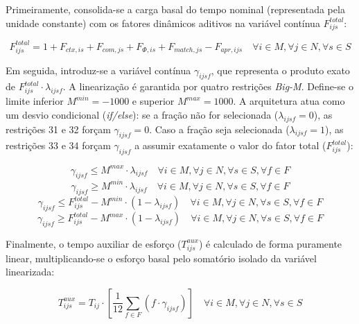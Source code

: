 \documentclass[a4paper,11pt]{article}
\begin{document}
Primeiramente, consolida-se a carga basal do tempo nominal (representada pela unidade constante) com os fatores dinâmicos aditivos na variável contínua $F^{total}_{ijs}$:

\begin{equation}
    F^{total}_{ijs} = 1 + F_{ctx, is} + F_{com, js} + F_{\Phi, is} + F_{match, js} - F_{apr, ijs} \quad \forall i \in M, \forall j \in N, \forall s \in S
\end{equation}

Em seguida, introduz-se a variável contínua $\gamma_{ijsf}$, que representa o produto exato de $F^{total}_{ijs} \cdot \lambda_{ijsf}$. A linearização é garantida por quatro restrições \textit{Big-M}. Define-se o limite inferior $M^{min} = -1000$ e superior $M^{max} = 1000$. A arquitetura atua como um desvio condicional (\textit{if/else}): se a fração não for selecionada ($\lambda_{ijsf} = 0$), as restrições 31 e 32 forçam $\gamma_{ijsf} = 0$. Caso a fração seja selecionada ($\lambda_{ijsf} = 1$), as restrições 33 e 34 forçam $\gamma_{ijsf}$ a assumir exatamente o valor do fator total ($F^{total}_{ijs}$):

\begin{equation}
    \gamma_{ijsf} \le M^{max} \cdot \lambda_{ijsf} \quad \forall i \in M, \forall j \in N, \forall s \in S, \forall f \in F
\end{equation}
\begin{equation}
    \gamma_{ijsf} \ge M^{min} \cdot \lambda_{ijsf} \quad \forall i \in M, \forall j \in N, \forall s \in S, \forall f \in F
\end{equation}
\begin{equation}
    \gamma_{ijsf} \le F^{total}_{ijs} - M^{min} \cdot (1 - \lambda_{ijsf}) \quad \forall i \in M, \forall j \in N, \forall s \in S, \forall f \in F
\end{equation}
\begin{equation}
    \gamma_{ijsf} \ge F^{total}_{ijs} - M^{max} \cdot (1 - \lambda_{ijsf}) \quad \forall i \in M, \forall j \in N, \forall s \in S, \forall f \in F
\end{equation}

Finalmente, o tempo auxiliar de esforço ($T^{aux}_{ijs}$) é calculado de forma puramente linear, multiplicando-se o esforço basal pelo somatório isolado da variável linearizada:

\begin{equation}
    T^{aux}_{ijs} = T_{ij} \cdot \left[ \frac{1}{12} \sum_{f \in F} \left( f \cdot \gamma_{ijsf} \right) \right] \quad \forall i \in M, \forall j \in N, \forall s \in S
\end{equation}
\end{document}
